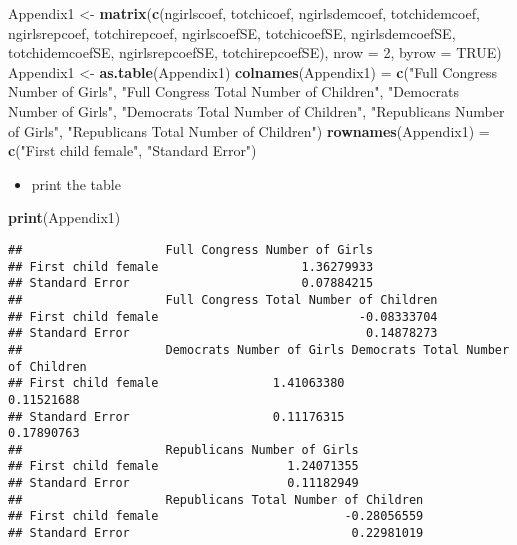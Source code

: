 \documentclass[
]{article}
\newenvironment{Shaded}{\begin{snugshade}}{\end{snugshade}}
\newcommand{\DataTypeTok}[1]{\textcolor[rgb]{0.13,0.29,0.53}{#1}}
\newcommand{\DecValTok}[1]{\textcolor[rgb]{0.00,0.00,0.81}{#1}}
\newcommand{\KeywordTok}[1]{\textcolor[rgb]{0.13,0.29,0.53}{\textbf{#1}}}
\newcommand{\NormalTok}[1]{#1}
\newcommand{\OtherTok}[1]{\textcolor[rgb]{0.56,0.35,0.01}{#1}}
\newcommand{\StringTok}[1]{\textcolor[rgb]{0.31,0.60,0.02}{#1}}
\providecommand{\tightlist}{%
  \setlength{\itemsep}{0pt}\setlength{\parskip}{0pt}}
\begin{document}
\begin{Shaded}
\begin{Highlighting}[]
\NormalTok{Appendix1 <-}\StringTok{ }\KeywordTok{matrix}\NormalTok{(}\KeywordTok{c}\NormalTok{(ngirlscoef, totchicoef, ngirlsdemcoef, totchidemcoef, ngirlsrepcoef, totchirepcoef, ngirlscoefSE, totchicoefSE, ngirlsdemcoefSE, totchidemcoefSE, ngirlsrepcoefSE, totchirepcoefSE), }\DataTypeTok{nrow =} \DecValTok{2}\NormalTok{, }\DataTypeTok{byrow =} \OtherTok{TRUE}\NormalTok{)}
\NormalTok{Appendix1 <-}\StringTok{ }\KeywordTok{as.table}\NormalTok{(Appendix1)}
\KeywordTok{colnames}\NormalTok{(Appendix1) =}\StringTok{ }\KeywordTok{c}\NormalTok{(}\StringTok{"Full Congress Number of Girls"}\NormalTok{, }\StringTok{"Full Congress Total Number of Children"}\NormalTok{, }\StringTok{"Democrats Number of Girls"}\NormalTok{, }\StringTok{"Democrats Total Number of Children"}\NormalTok{, }\StringTok{"Republicans Number of Girls"}\NormalTok{, }\StringTok{"Republicans Total Number of Children"}\NormalTok{)}
\KeywordTok{rownames}\NormalTok{(Appendix1) =}\StringTok{ }\KeywordTok{c}\NormalTok{(}\StringTok{"First child female"}\NormalTok{, }\StringTok{"Standard Error"}\NormalTok{)}
\end{Highlighting}
\end{Shaded}

\begin{itemize}
\tightlist
\item
  print the table
\end{itemize}

\begin{Shaded}
\begin{Highlighting}[]
\KeywordTok{print}\NormalTok{(Appendix1)}
\end{Highlighting}
\end{Shaded}

\begin{verbatim}
##                    Full Congress Number of Girls
## First child female                    1.36279933
## Standard Error                        0.07884215
##                    Full Congress Total Number of Children
## First child female                            -0.08333704
## Standard Error                                 0.14878273
##                    Democrats Number of Girls Democrats Total Number of Children
## First child female                1.41063380                         0.11521688
## Standard Error                    0.11176315                         0.17890763
##                    Republicans Number of Girls
## First child female                  1.24071355
## Standard Error                      0.11182949
##                    Republicans Total Number of Children
## First child female                          -0.28056559
## Standard Error                               0.22981019
\end{verbatim}
\end{document}
